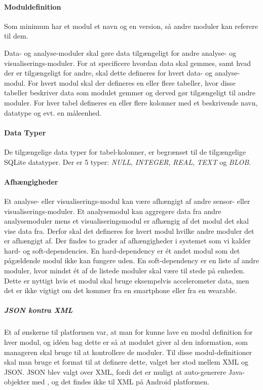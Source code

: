 \paragraph{Moduldefinition}
Som minimum har et modul et navn og en version, så andre moduler kan referere til dem.

Data- og analyse-moduler skal gøre data tilgængeligt for andre analyse- og visualiserings-moduler.
For at specificere hvordan data skal gemmes, samt hvad der er tilgængeligt for andre, skal dette defineres for hvert data- og analyse-modul.
For hvert modul skal der defineres en eller flere tabeller, hvor disse tabeller beskriver data som modulet gemmer og derved gør tilgængeligt til andre moduler.
For hver tabel defineres en eller flere kolonner med et beskrivende navn, datatype og evt. en måleenhed.

\paragraph{Data Typer}
De tilgængelige data typer for tabel-kolonner, er begrænset til de tilgængelige SQLite datatyper.
Der er 5 typer: \textit{NULL}, \textit{INTEGER}, \textit{REAL}, \textit{TEXT} og \textit{BLOB}.

\paragraph{Afhængigheder}
Et analyse- eller visualiserings-modul kan være afhængigt af andre sensor- eller visualiserings-moduler.
Et analysemodul kan aggregere data fra andre analysemoduler mens et visualiseringsmodul er afhængig af det modul det skal vise data fra.
Derfor skal det defineres for hvert modul hvilke andre moduler det er afhængigt af.
Der findes to grader af afhængigheder i systemet som vi kalder hard- og soft-dependencies.
En hard-dependency er ét andet modul som det pågældende modul ikke kan fungere uden.
En soft-dependency er en liste af andre moduler, hvor mindst ét af de listede moduler skal være til stede på enheden.
Dette er nyttigt hvis et modul skal bruge eksempelvis accelerometer data, men det er ikke vigtigt om det kommer fra en smartphone eller fra en wearable.

\subparagraph{JSON kontra XML}
Et af ønskerne til platformen var, at man for kunne lave en modul definition for hver modul, og idéen bag dette er så at modulet giver al den information, som manageren skal bruge til at kontrollere de moduler. 
Til disse modul-definitioner skal man bruge et format til at definere dette, valget her stod mellem XML og JSON.
JSON blev valgt over XML, fordi det er muligt at auto-generere Java-objekter med \citet{jsonpojo}, og det findes ikke til XML på Android platformen.

